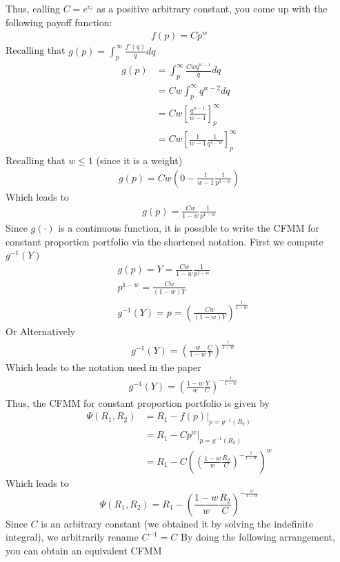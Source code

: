 \documentclass[12pt]{article}
\begin{document}
Thus, calling $C=e^{c_c}$ as a positive arbitrary constant, you come up with the following payoff function:
\begin{align*}
    f(p)=Cp^w
\end{align*}
Recalling that $g(p)=\int_p^\infty \frac{f'(q)}{q} dq$
\begin{align*}
    g(p) & = \int_p^\infty \frac{Cwq^{w-1}}{q} dq                  \\
         & =Cw\int_p^\infty q^{w-2} dq                             \\
         & =Cw\left[\frac{q^{w-1}}{w-1} \right]_p^\infty           \\
         & =Cw\left[\frac{1}{w-1}\frac{1}{q^{1-w}}\right]_p^\infty
\end{align*}
Recalling that $w\leq 1$ (since it is a weight)
\begin{align*}
    g(p) = Cw\left(0-\frac{1}{w-1}\frac{1}{p^{1-w}}\right)
\end{align*}
Which leads to
\begin{align*}
    g(p)=\frac{Cw}{1-w}\frac{1}{p^{1-w}}
\end{align*}
Since $g(\cdot)$ is a continuous function, it is possible to write the CFMM for constant proportion portfolio via the shortened notation. First we compute $g^{-1}(Y)$
\begin{align*}
     & g(p) =Y  = \frac{Cw}{1-w}\frac{1}{p^{1-w}}                   \\
     & p^{1-w} = \frac{Cw}{(1-w)Y}                                  \\
     & g^{-1}(Y)=p = \left(\frac{Cw}{(1-w)Y}\right)^{\frac{1}{1-w}}
\end{align*}
Or Alternatively
\begin{align*}
     & g^{-1}(Y) = \left(\frac{w}{1-w} \frac{C}{Y}\right)^{\frac{1}{1-w}}
\end{align*}
Which leads to the notation used in the paper
\begin{align*}
     & g^{-1}(Y) = \left(\frac{1-w}{w} \frac{Y}{C}\right)^{-\frac{1}{1-w}}
\end{align*}
Thus, the CFMM for constant proportion portfolio is given by
\begin{align*}
    \Psi(R_1,R_2) & = R_1 -f(p)|_{p=g^{-1}(R_2)}                                                     \\
                  & = R_1 -Cp^w|_{p=g^{-1}(R_2)}                                                     \\
                  & = R_1 -C\left(\left(\frac{1-w}{w} \frac{R_2}{C}\right)^{-\frac{1}{1-w}}\right)^w
\end{align*}
Which leads to
\begin{equation}
    \Psi(R_1,R_2)= R_1 -\left(\frac{1-w}{w} \frac{R_2}{C}\right)^{-\frac{w}{1-w}}  \label{eq:18}
\end{equation}
Since $C$ is an arbitrary constant (we obtained it by solving the indefinite integral), we arbitrarily rename $C^{-1}=C$
By doing the following arrangement, you can obtain an equivalent CFMM
\end{document}
